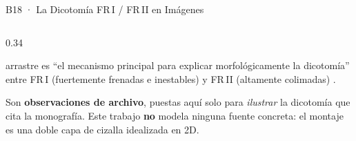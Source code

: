 \documentclass[aspectratio=169,9pt]{beamer}
\begin{document}
\begin{frame}{B18 · La Dicotom\'ia FR\,I / FR\,II en Im\'agenes}
\begin{columns}[T]
\begin{column}{0.34\textwidth}
\begin{tcolorbox}[EQ={Qu\'e dice la monograf\'ia}]
    arrastre es ``el mecanismo principal para explicar morfol\'ogicamente la
    dicotom\'ia'' entre FR\,I (fuertemente frenadas e inestables) y FR\,II
    (altamente colimadas) \citep{osmanov-2008}.
  \end{tcolorbox}
  \vspace{0.10cm}
  \begin{tcolorbox}[WRN={Alcance de estas im\'agenes}]
    \scriptsize
    Son \textbf{observaciones de archivo}, puestas aqu\'i solo para
    \emph{ilustrar} la dicotom\'ia que cita la monograf\'ia. Este trabajo
    \textbf{no} modela ninguna fuente concreta: el montaje es una doble capa
    de cizalla idealizada en 2D.
  \end{tcolorbox}
\end{column}
\end{columns}
\end{frame}
\end{document}
